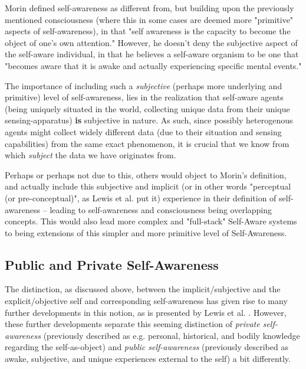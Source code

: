 	Morin defined self-awareness as different from, but building upon the previously mentioned consciousness (where this in some cases are deemed more "primitive" aspects of self-awareness), in that "self awareness is the capacity to become the object of one's own attention." However, he doesn't deny the subjective aspect of the self-aware individual, in that he believes a self-aware organism to be one that "becomes aware that it is awake and actually experiencing specific mental events."

	The importance of including such a \textit{subjective} (perhaps more underlying and primitive) level of self-awareness, lies in the realization that self-aware agents (being uniquely situated in the world, collecting unique data from their unique sensing-apparatus) \textbf{is} subjective in nature. As such, since possibly heterogenous agents might collect widely different data (due to their situation and sensing capabilities) from the same exact phenomenon, it is crucial that we know from which \textit{subject} the data we have originates from.

	Perhaps or perhaps not due to this, others would object to Morin's definition, and actually include this subjective and implicit (or in other words "perceptual (or pre-conceptual)", as Lewis et al. \cite{sacs16_ch2} put it) experience in their definition of self-awareness -- leading to self-awareness and consciousness being overlapping concepts. This would also lead more complex and "full-stack" Self-Aware systems to being extensions of this simpler and more primitive level of Self-Awareness.


	\subsection{Public and Private Self-Awareness}

	The distinction, as discussed above, between the implicit/subjective and the explicit/objective self and corresponding self-awareness has given rise to many further developments in this notion, as is presented by Lewis et al. \cite{sacs16_ch2}. However, these further developments separate this seeming distinction of \textit{private self-awareness} (previously described as e.g. personal, historical, and bodily knowledge regarding the self-as-object) and \textit{public self-awareness} (previously described as awake, subjective, and unique experiences external to the self) a bit differently.


